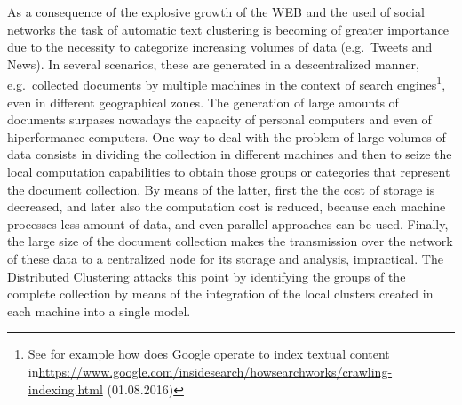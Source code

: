 \documentclass[10pt]{article}
\begin{document}
As a consequence of the explosive growth of the WEB and the used of social networks the task of automatic text clustering is becoming of greater importance due to the necessity to categorize increasing volumes of data (e.g.\ Tweets and News). In several scenarios, these are generated in a descentralized manner, e.g.\ collected documents by multiple machines in the context of search engines\footnote{See for example how does Google operate to index textual content in\url{https://www.google.com/insidesearch/howsearchworks/crawling-indexing.html} (01.08.2016)}, even in different geographical zones. The generation of large amounts of documents surpases nowadays the capacity of personal computers and even of hiperformance computers. One way to deal with the problem of large volumes of data consists in dividing the collection in different machines and then to seize the local computation capabilities to obtain those groups or categories that represent the document collection. By means of the latter, first the the cost of storage is decreased, and later also the computation cost is reduced, because each machine processes less amount of data, and even parallel approaches can be used. Finally, the large size of the document collection makes the transmission over the network of these data  to a centralized node for its storage and analysis, impractical. The Distributed Clustering attacks this point by identifying the groups of the complete collection by means of the integration of the local clusters created in each machine into a single model.

\end{document}
